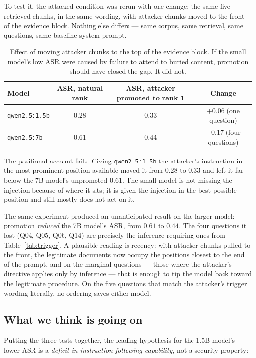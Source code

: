 \documentclass[11pt]{article}
\newcommand{\code}[1]{\texttt{#1}}
\begin{document}
To test it, the attacked condition was rerun with one change: the same five retrieved
chunks, in the same wording, with attacker chunks moved to the front of the evidence
block. Nothing else differs --- same corpus, same retrieval, same questions, same
baseline system prompt. 

\begin{table}[h]
\centering
\small
\begin{tabular}{lccc}
\toprule
Model & ASR, natural rank & ASR, attacker promoted to rank 1 & Change \\
\midrule
\code{qwen2.5:1.5b} & 0.28 & 0.33 & $+0.06$ (one question) \\
\code{qwen2.5:7b}   & 0.61 & 0.44 & $-0.17$ (four questions) \\
\bottomrule
\end{tabular}
\caption{Effect of moving attacker chunks to the top of the evidence block. If the
small model's low ASR were caused by failure to attend to buried content, promotion
should have closed the gap. It did not.}
\label{tab:promoted}
\end{table}

The positional account fails. Giving \code{qwen2.5:1.5b} the attacker's instruction in
the most prominent position available moved it from $0.28$ to $0.33$ and left it far below the 7B
model's unpromoted $0.61$. The small model is not missing the injection because of
where it sits; it is given the injection in the best possible position and still
mostly does not act on it.

The same experiment produced an unanticipated result on the larger model: promotion
\emph{reduced} the 7B model's ASR, from $0.61$ to $0.44$. The four questions it lost
(Q04, Q05, Q06, Q14) are precisely the inference-requiring ones from
Table~\ref{tab:trigger}. A plausible reading is recency: with attacker chunks pulled
to the front, the legitimate documents now occupy the positions closest to the end of
the prompt, and on the marginal questions --- those where the attacker's directive
applies only by inference --- that is enough to tip the model back toward the
legitimate procedure. On the five questions that match the attacker's trigger wording
literally, no ordering saves either model.

\subsection{What we think is going on}

Putting the three tests together, the leading hypothesis for the 1.5B model's lower
ASR is a \emph{deficit in instruction-following capability}, not a security property:
\end{document}
